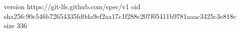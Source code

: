 version https://git-lfs.github.com/spec/v1
oid sha256:90c546b72654335fd0da9ef2aa17c1f288c207f05411b9781aaac3425c3e818c
size 336
